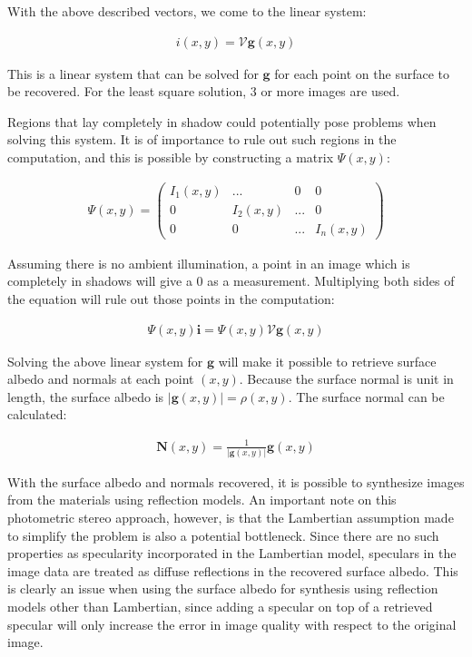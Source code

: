 \noindent With the above described vectors, we come to the linear system:

	\begin{eqnarray*}
		i(x,y) = \mathcal{V}\textbf{g}(x,y)
	\end{eqnarray*}

\noindent This is a linear system that can be solved for $\textbf{g}$ for each point on the surface to be recovered. For the least square solution, 3 or more images are used.

Regions that lay completely in shadow could potentially pose problems when solving this system. It is of importance to rule out such regions in the computation, and this is possible by constructing a matrix $\Psi(x,y)$:

	\begin{eqnarray*}
		\Psi(x,y) = \begin{pmatrix} I_1(x,y) & ... & 0 & 0\\ 
									0 & I_2(x,y) & ... & 0\\ 
									0 & 0 & ... & I_n(x,y) \end{pmatrix}
	\end{eqnarray*}

\noindent Assuming there is no ambient illumination, a point in an image which is completely in shadows will give a 0 as a measurement. Multiplying both sides of the equation will rule out those points in the computation:

	\begin{eqnarray*}
		\Psi(x,y)\textbf{i} = \Psi(x,y)\mathcal{V}\textbf{g}(x,y)
	\end{eqnarray*}

\noindent Solving the above linear system for $\textbf{g}$ will make it possible to retrieve surface albedo and normals at each point $(x,y)$. Because the surface normal is unit in length, the surface albedo is $|\textbf{g}(x,y)| = \rho(x,y)$. The surface normal can be calculated:

	\begin{eqnarray*}
		\textbf{N}(x,y) = \frac{1}{|\textbf{g}(x,y)|}\textbf{g}(x,y)
	\end{eqnarray*}

\noindent With the surface albedo and normals recovered, it is possible to synthesize images from the materials using reflection models. An important note on this photometric stereo approach, however, is that the Lambertian assumption made to simplify the problem is also a potential bottleneck. Since there are no such properties as specularity incorporated in the Lambertian model, speculars in the image data are treated as diffuse reflections in the recovered surface albedo. This is clearly an issue when using the surface albedo for synthesis using reflection models other than Lambertian, since adding a specular on top of a retrieved specular will only increase the error in image quality with respect to the original image.

